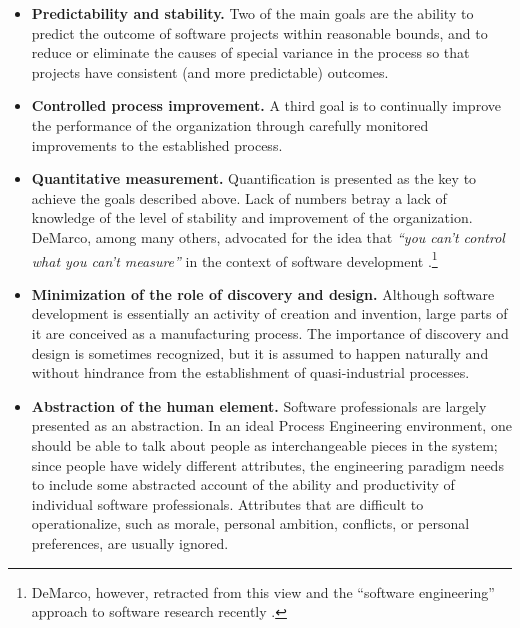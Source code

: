 \begin{itemize}
\item \textbf{Predictability and stability.} Two of the main goals are the ability to predict the outcome of software projects within reasonable bounds, and to reduce or eliminate the causes of special variance in the process so that projects have consistent (and more predictable) outcomes.

\item \textbf{Controlled process improvement.} A third goal is to continually improve the performance of the organization through carefully monitored improvements to the established process.

\item \textbf{Quantitative measurement.} Quantification is presented as the key to achieve the goals described above. Lack of numbers betray a lack of knowledge of the level of stability and improvement of the organization. DeMarco, among many others, advocated for the idea that \emph{``you can't control what you can't measure''} in the context of software development \cite{DeMarco1986}.\footnote{DeMarco, however, retracted from this view and the ``software engineering'' approach to software research recently \cite{DeMarco2009}.}

\item \textbf{Minimization of the role of discovery and design.} Although software development is essentially an activity of creation and invention, large parts of it are conceived as a manufacturing process. The importance of discovery and design is sometimes recognized, but it is assumed to happen naturally and without hindrance from the establishment of quasi-industrial processes.

\item \textbf{Abstraction of the human element.} Software professionals are largely presented as an abstraction. In an ideal Process Engineering environment, one should be able to talk about people as interchangeable pieces in the system; since people have widely different attributes, the engineering paradigm needs to include some abstracted account of the ability and productivity of individual software professionals. Attributes that are difficult to operationalize, such as morale, personal ambition, conflicts, or personal preferences, are usually ignored.
\end{itemize}

